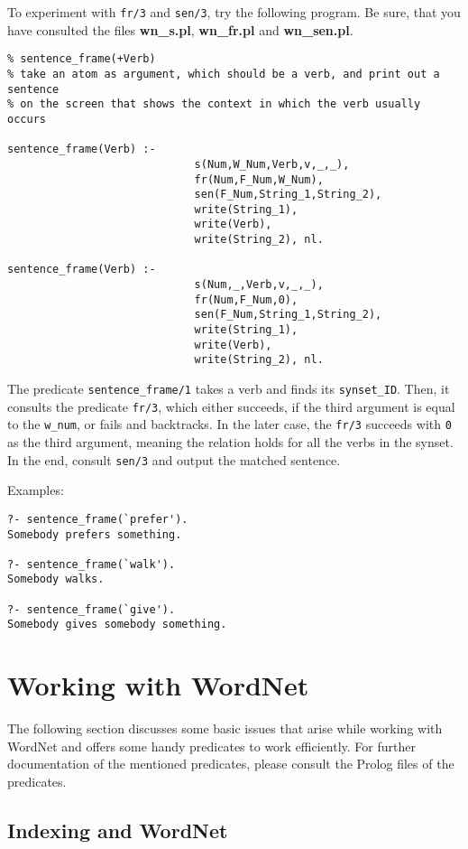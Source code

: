 \documentclass[12pt]{article}
\begin{document}
To experiment with {\tt fr/3} and {\tt sen/3}, try the following program. Be sure, that you have consulted
the files {\bfseries wn\_s.pl}, {\bfseries wn\_fr.pl} and {\bfseries wn\_sen.pl}.
\begin{verbatim}
% sentence_frame(+Verb)
% take an atom as argument, which should be a verb, and print out a sentence
% on the screen that shows the context in which the verb usually occurs

sentence_frame(Verb) :-
                             s(Num,W_Num,Verb,v,_,_),
                             fr(Num,F_Num,W_Num),
                             sen(F_Num,String_1,String_2),
                             write(String_1),
                             write(Verb),
                             write(String_2), nl.

sentence_frame(Verb) :-
                             s(Num,_,Verb,v,_,_),
                             fr(Num,F_Num,0),
                             sen(F_Num,String_1,String_2),
                             write(String_1),
                             write(Verb),
                             write(String_2), nl.
\end{verbatim}
The predicate {\tt sentence\_frame/1} takes a verb and finds its {\tt synset\_ID}.
Then, it consults the predicate {\tt fr/3}, which either succeeds, if the third argument
is equal to the {\tt w\_num}, or fails and backtracks.
In the later case, the {\tt fr/3} succeeds with {\tt 0} as the third argument, meaning the relation holds for all the verbs in the synset.
In the end, consult {\tt sen/3} and output the matched sentence.

Examples:
\begin{verbatim}
?- sentence_frame(`prefer').
Somebody prefers something.

?- sentence_frame(`walk').
Somebody walks.

?- sentence_frame(`give').
Somebody gives somebody something.
\end{verbatim}


\section{Working with WordNet}

The following section discusses some basic issues that arise while working with WordNet and offers some
handy predicates to work efficiently. For further documentation of the mentioned predicates, please consult
the Prolog files of the predicates.

\subsection{Indexing and WordNet}
\end{document}
